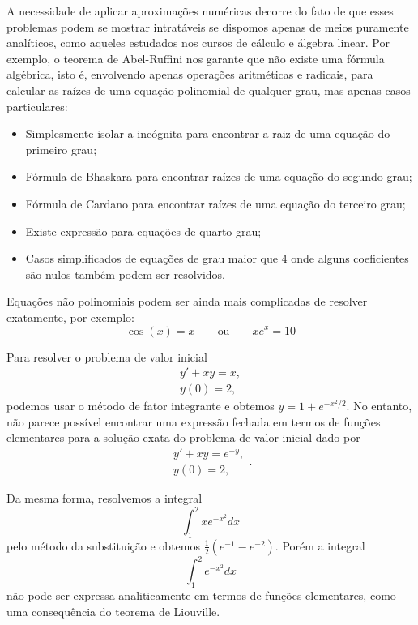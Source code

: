 A necessidade de aplicar aproximações numéricas decorre do fato de que esses problemas podem se mostrar intratáveis se dispomos apenas de meios puramente analíticos, como aqueles estudados nos cursos de cálculo e álgebra linear. Por exemplo, o teorema de Abel-Ruffini nos garante que não existe uma fórmula algébrica, isto é, envolvendo apenas operações aritméticas e radicais, para calcular as raízes de uma equação polinomial de qualquer grau, mas apenas casos particulares:
\begin{itemize}
\item Simplesmente isolar a incógnita para encontrar a raiz de uma equação do primeiro grau;
\item Fórmula de Bhaskara para encontrar raízes de uma equação do segundo grau;
\item Fórmula de Cardano para encontrar raízes de uma equação do terceiro grau;
\item Existe expressão para equações de quarto grau;
\item Casos simplificados de equações de grau maior que 4 onde alguns coeficientes são nulos também podem ser resolvidos.
\end{itemize}
Equações não polinomiais podem ser ainda mais complicadas de resolver exatamente, por exemplo:
\begin{equation}
\cos(x)=x\qquad \text{ou}\qquad xe^x= 10
\end{equation}

Para resolver o problema de valor inicial
\begin{equation}
\begin{array}{l}
y'+xy=x,\\
y(0)=2,
\end{array}
\end{equation}
podemos usar o método de fator integrante e obtemos $y=1+e^{-x^2/2}$. No entanto, não parece possível  encontrar uma expressão fechada em termos de funções elementares para a solução exata do problema de valor inicial dado por
\begin{equation}
\begin{array}{l}
y'+xy=e^{-y},\\
y(0)=2,
\end{array}.
\end{equation}


Da mesma forma, resolvemos a integral
\begin{equation}
\int_1^2xe^{-x^2}dx
\end{equation}
pelo método da substituição e obtemos $\frac{1}{2}(e^{-1}-e^{-2})$. Porém a integral
\begin{equation}
\int_1^2 e^{-x^2} dx
\end{equation}
não pode ser expressa analiticamente em termos de funções elementares, como uma consequência do teorema de Liouville.

